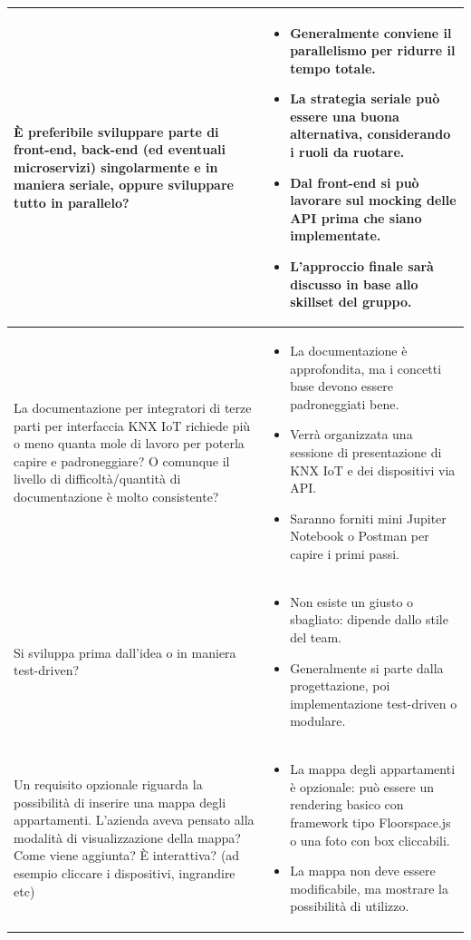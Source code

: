 \documentclass[a4paper,11pt]{article}
\begin{document}
{\begin{tabularx}{\textwidth}{|>{\raggedright\arraybackslash}X|>{\raggedright\arraybackslash}X|}
\hline
È preferibile sviluppare parte di front-end, back-end (ed eventuali microservizi) singolarmente e in maniera seriale, oppure sviluppare tutto in parallelo?
&
\begin{itemize}
\item Generalmente conviene il parallelismo per ridurre il tempo totale.
\item La strategia seriale può essere una buona alternativa, considerando i ruoli da ruotare.
\item Dal front-end si può lavorare sul mocking delle API prima che siano implementate.
\item L'approccio finale sarà discusso in base allo skillset del gruppo.
\end{itemize} \\
\hline
La documentazione per integratori di terze parti per interfaccia KNX IoT richiede più o meno quanta mole di lavoro per poterla capire e padroneggiare? O comunque il livello di difficoltà/quantità di documentazione è molto consistente?
&
\begin{itemize}
\item La documentazione è approfondita, ma i concetti base devono essere padroneggiati bene.
\item Verrà organizzata una sessione di presentazione di KNX IoT e dei dispositivi via API.
\item Saranno forniti mini Jupiter Notebook o Postman per capire i primi passi.
\end{itemize} \\
\hline
Si sviluppa prima dall'idea o in maniera test-driven?
&
\begin{itemize}
\item Non esiste un giusto o sbagliato: dipende dallo stile del team.
\item Generalmente si parte dalla progettazione, poi implementazione test-driven o modulare.
\end{itemize} \\
\hline
Un requisito opzionale riguarda la possibilità di inserire una mappa degli appartamenti. L'azienda aveva pensato alla modalità di visualizzazione della mappa? Come viene aggiunta? È interattiva? (ad esempio cliccare i dispositivi, ingrandire etc)
&
\begin{itemize}
\item La mappa degli appartamenti è opzionale: può essere un rendering basico con framework tipo Floorspace.js o una foto con box cliccabili.
\item La mappa non deve essere modificabile, ma mostrare la possibilità di utilizzo.
\end{itemize}\\
\hline
\end{tabularx}
}
\end{document}

